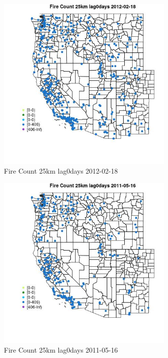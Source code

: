 \begin{figure} 
\centering  
\includegraphics[width=0.77\textwidth]{Code_Outputs/Report_ML_input_PM25_Step4_part_f_de_duplicated_aves_prioritize_24hr_obswNAs_MapObsFire_Count_25km_lag0days2012-02-18.jpg} 
\caption{\label{fig:Report_ML_input_PM25_Step4_part_f_de_duplicated_aves_prioritize_24hr_obswNAsMapObsFire_Count_25km_lag0days2012-02-18}Fire Count 25km lag0days 2012-02-18} 
\end{figure} 
 

\clearpage 

\begin{figure} 
\centering  
\includegraphics[width=0.77\textwidth]{Code_Outputs/Report_ML_input_PM25_Step4_part_f_de_duplicated_aves_prioritize_24hr_obswNAs_MapObsFire_Count_25km_lag0days2011-05-16.jpg} 
\caption{\label{fig:Report_ML_input_PM25_Step4_part_f_de_duplicated_aves_prioritize_24hr_obswNAsMapObsFire_Count_25km_lag0days2011-05-16}Fire Count 25km lag0days 2011-05-16} 
\end{figure} 
 

